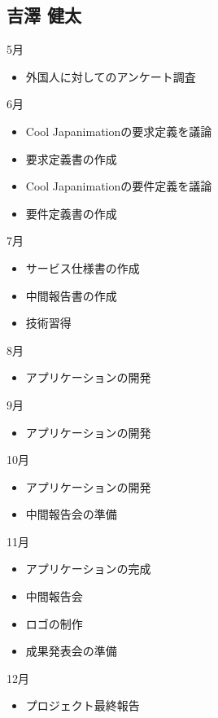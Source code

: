 \subsection{吉澤 健太}
5月
\begin{itemize}
\item 外国人に対してのアンケート調査
\end{itemize}
6月
\begin{itemize}
\item Cool Japanimationの要求定義を議論
\item 要求定義書の作成
\item Cool Japanimationの要件定義を議論
\item 要件定義書の作成
\end{itemize}
7月
\begin{itemize}
\item サービス仕様書の作成
\item 中間報告書の作成
\item 技術習得
\end{itemize}
8月
\begin{itemize}
\item アプリケーションの開発
\end{itemize}
9月
\begin{itemize}
\item アプリケーションの開発
\end{itemize}
10月
\begin{itemize}
\item アプリケーションの開発
\item 中間報告会の準備
\end{itemize}
11月
\begin{itemize}
\item アプリケーションの完成
\item 中間報告会
\item ロゴの制作
\item 成果発表会の準備
\end{itemize}
12月
\begin{itemize}
\item プロジェクト最終報告
\end{itemize}
